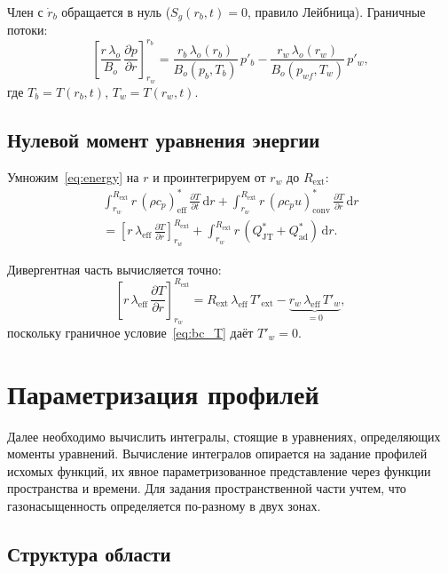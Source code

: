 \documentclass[12pt,a4paper]{article}
\newcommand{\dd}{\mathrm{d}}
\newcommand{\pp}{\partial}
\newcommand{\ext}{\mathrm{ext}}
\newcommand{\eff}{\mathrm{eff}}
\begin{document}
Член с $\dot{r}_b$ обращается в нуль ($S_g(r_b,t) = 0$,
правило Лейбница). Граничные потоки:
\begin{equation}\label{eq:Sg_flux}
  \left[\frac{r\,\lambda_o}{B_o}\,\frac{\pp p}{\pp r}\right]_{r_w}^{r_b}
  = \frac{r_b\,\lambda_o(r_b)}{B_o(p_b,T_b)}\,p'_b
    - \frac{r_w\,\lambda_o(r_w)}{B_o(p_{wf},T_w)}\,p'_w,
\end{equation}
где $T_b = T(r_b,t)$, $T_w = T(r_w,t)$.


\subsection{Нулевой момент уравнения энергии}

Умножим~\eqref{eq:energy} на $r$ и проинтегрируем
от $r_w$ до $R_\ext$:
\begin{multline}\label{eq:T_moment0}
  \int_{r_w}^{R_\ext} r\,(\rho c_p)_\eff^*\,
    \frac{\pp T}{\pp t}\,\dd r
  + \int_{r_w}^{R_\ext} r\,(\rho c_p u)_\mathrm{conv}^*\,
    \frac{\pp T}{\pp r}\,\dd r \\
  = \left[r\,\lambda_\eff\,\frac{\pp T}{\pp r}
    \right]_{r_w}^{R_\ext}
  + \int_{r_w}^{R_\ext} r\,(Q_\mathrm{JT}^* + Q_\mathrm{ad}^*)\,\dd r.
\end{multline}

Дивергентная часть вычисляется точно:
\begin{equation}\label{eq:T_flux}
  \left[r\,\lambda_\eff\,\frac{\pp T}{\pp r}
    \right]_{r_w}^{R_\ext}
  = R_\ext\,\lambda_\eff\,T'_\ext
    - \underbrace{r_w\,\lambda_\eff\,T'_w}_{= 0},
\end{equation}
поскольку граничное условие~\eqref{eq:bc_T} даёт $T'_w = 0$.


\section{Параметризация профилей}\label{sec:profiles}

Далее необходимо вычислить интегралы, стоящие в уравнениях, 
определяющих моменты уравнений. Вычисление интегралов опирается на 
задание профилей исхомых функций, их явное параметризованное представление
через функции пространства и времени. Для задания пространственной части учтем,
что газонасыщенность определяется по-разному в двух зонах.


\subsection{Структура области}
\end{document}
